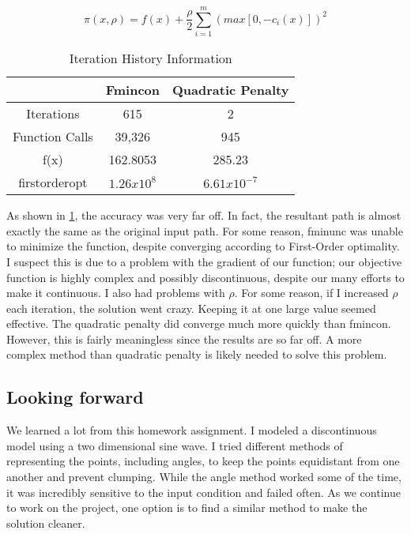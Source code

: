 \documentclass{article}
\begin{document}
\begin{equation}
    \pi (x,\rho) = f(x) + \frac{\rho}{2} \sum_{i=1}^{m} (max[0, -c_i(x)])^2
    \label{eq:qp}
\end{equation}


\begin{table}[htbp]
\caption{Iteration History Information}
\label{tab:results}
\begin{center}
\begin{tabular}{|| c || c || c ||}
\hline \hline
 & Fmincon & Quadratic Penalty\\
\hline
Iterations & 615 & 2\\
\hline
Function Calls & 39,326 & 945\\
\hline
f(x) & 162.8053 & 285.23\\
\hline
firstorderopt & $1.26 x 10^8$ & $6.61 x 10^{-7}$\\

\hline \hline
\end{tabular}
\end{center}
\end{table}

As shown in \cref{tab:results}, the accuracy was very far off. In fact, the resultant path is almost exactly the same as the original input path. For some reason, fminunc was unable to minimize the function, despite converging according to First-Order optimality. I suspect this is due to a problem with the gradient of our function; our objective function is highly complex and possibly discontinuous, despite our many efforts to make it continuous. I also had problems with $\rho$. For some reason, if I increased $\rho$ each iteration, the solution went crazy. Keeping it at one large value seemed effective. The quadratic penalty did converge much more quickly than fmincon. However, this is fairly meaningless since the results are so far off. A more complex method than quadratic penalty is likely needed to solve this problem.

\subsection{Looking forward}
We learned a lot from this homework assignment. I modeled a discontinuous model using a two dimensional sine wave. I tried different methods of representing the points, including angles, to keep the points equidistant from one another and prevent clumping. While the angle method worked some of the time, it was incredibly sensitive to the input condition and failed often. As we continue to work on the project, one option is to find a similar method to make the solution cleaner.
\end{document}
